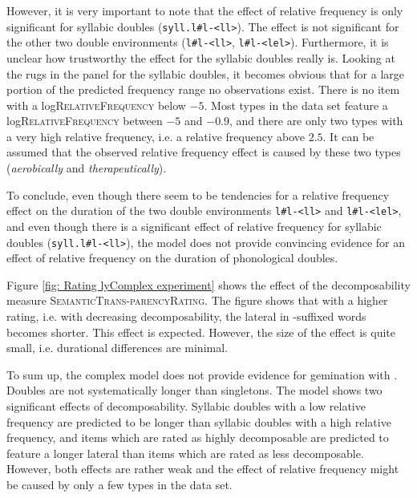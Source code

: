 However, it is very important to note that the effect of relative frequency is only significant for syllabic doubles (\texttt{syll.l\#l-<ll>}).  The effect is not significant for the other two double environments (\texttt{l\#l-<ll>}, \texttt{l\#l-<lel>}). 
Furthermore, it is unclear how trustworthy the effect for the syllabic doubles really is. Looking at the rugs in the panel for the syllabic doubles, it becomes obvious that for a large portion of the predicted frequency range no observations exist. There is no item with a log\textsc{RelativeFrequency} below $-5$. 
Most types in the data set feature a log\textsc{RelativeFrequency} between $-5$ and $-0.9$, and there are only two types with a very high relative frequency, i.e. a relative frequency  above $2.5$. It can be assumed that the observed relative frequency effect is caused by these two types (\textit{aerobically} and \textit{therapeutically}). 


To conclude, even though there seem to be tendencies for a relative frequency effect on the duration of the two double environments  \texttt{l\#l-<ll>} and \texttt{l\#l-<lel>}, and even though there is a significant effect of relative frequency for syllabic doubles  (\texttt{syll.l\#l-<ll>}), the model does not provide convincing evidence for an effect of relative frequency on the duration of phonological doubles.







Figure \ref{fig: Rating  lyComplex experiment} shows the effect of the decomposability measure \textsc{SemanticTrans-parencyRating}. The figure shows that with a higher rating, i.e. with decreasing decomposability, the lateral in -suffixed words becomes shorter. This effect is expected. However, the size of the effect is quite small, i.e. durational differences are minimal.





To sum up, the complex model does not provide evidence for gemination with . Doubles are not systematically longer than singletons. 
The model shows two significant effects of decomposability. Syllabic doubles with a low relative frequency are predicted to be longer than syllabic doubles with a high relative frequency, and items which are rated as highly decomposable are predicted to feature a longer lateral than items which are rated as less decomposable. However, both effects are rather weak and the effect of relative frequency might be caused by only a few types in the data set.



